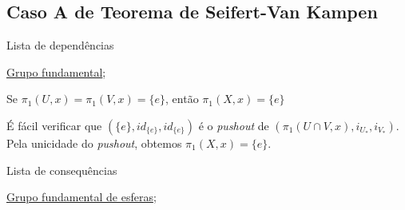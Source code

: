 \subsection{Caso A de Teorema de Seifert-Van Kampen} %
\label{teorema-s-vk-caso-a-prop}
\begin{titlemize}{Lista de dependências}
	\item \hyperref[grupo-fundamental]{Grupo fundamental};\\
\end{titlemize}
\begin{prop}
    Se $\pi_1(U,x)=\pi_1(V,x)=\{e\}$, então $\pi_1(X,x)=\{e\}$
\end{prop}
\begin{dem}
    É fácil verificar que $(\{e\},id_{\{e\}},id_{\{e\}})$ é o \emph{pushout} de $(\pi_1(U\cap V,x),i_{U_*},i_{V_*})$. Pela unicidade do \emph{pushout}, obtemos $\pi_1(X,x)=\{e\}$.
\end{dem}
\begin{titlemize}{Lista de consequências}
	\item \hyperref[grupo-fundamental-de-esferas-prop]{Grupo fundamental de esferas};\\ %
\end{titlemize}
